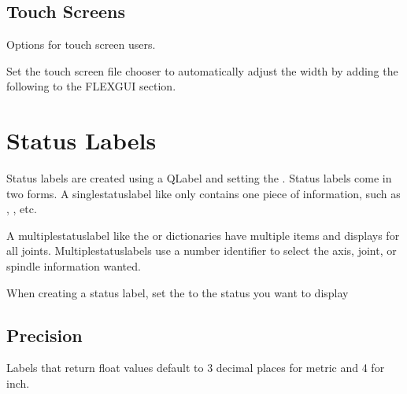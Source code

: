 \documentclass[letterpaper,10pt,english]{sphinxmanual}
\begin{document}
\section{Touch Screens}
\label{\detokenize{ini:touch-screens}}
\sphinxAtStartPar
Options for touch screen users.

\sphinxAtStartPar
Set the touch screen file chooser to automatically adjust the width by adding the
following to the FLEXGUI section.

\begin{sphinxVerbatim}[commandchars=\\\{\}]
\PYG{p}{[}\PYG{p}{]}
  
\end{sphinxVerbatim}

\sphinxstepscope


\chapter{Status Labels}
\label{\detokenize{labels:status-labels}}\label{\detokenize{labels::doc}}
\sphinxAtStartPar
{}

\sphinxAtStartPar
Status labels are created using a QLabel and setting the . Status
labels come in two forms. A single\sphinxhyphen{}status\sphinxhyphen{}label like  only
contains one piece of information, such as , , etc.

\sphinxAtStartPar
A multiple\sphinxhyphen{}status\sphinxhyphen{}label like the  or  dictionaries have multiple
items and displays for all joints. Multiple\sphinxhyphen{}status\sphinxhyphen{}labels use a number
identifier to select the axis, joint, or spindle information wanted.

\sphinxAtStartPar
When creating a status label, set the  to the status you want to
display



\section{Precision}
\label{\detokenize{labels:precision}}
\sphinxAtStartPar
Labels that return float values default to 3 decimal places for metric and 4
for inch.
\end{document}
